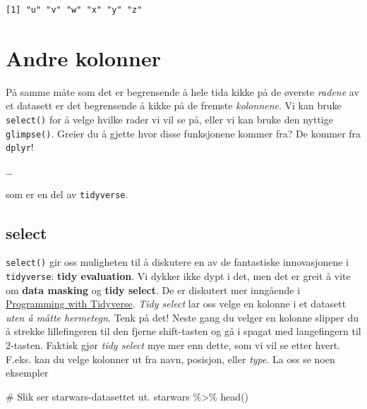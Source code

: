 \documentclass[
  letterpaper,
  DIV=11,
  numbers=noendperiod]{scrreprt}
\newenvironment{Shaded}{\begin{snugshade}}{\end{snugshade}}
\newcommand{\CommentTok}[1]{\textcolor[rgb]{0.37,0.37,0.37}{#1}}
\newcommand{\FunctionTok}[1]{\textcolor[rgb]{0.28,0.35,0.67}{#1}}
\newcommand{\NormalTok}[1]{\textcolor[rgb]{0.00,0.23,0.31}{#1}}
\newcommand{\SpecialCharTok}[1]{\textcolor[rgb]{0.37,0.37,0.37}{#1}}
\begin{document}
\begin{verbatim}
[1] "u" "v" "w" "x" "y" "z"
\end{verbatim}

\hypertarget{andre-kolonner}{%
\section{Andre kolonner}\label{andre-kolonner}}

På samme måte som det er begrensende å hele tida kikke på de øverste
\emph{radene} av et datasett er det begrensende å kikke på de fremste
\emph{kolonnene}. Vi kan bruke \texttt{select()} for å velge hvilke
rader vi vil se på, eller vi kan bruke den nyttige \texttt{glimpse()}.
Greier du å gjette hvor disse funksjonene kommer fra? De kommer fra
\texttt{dplyr}!

\ldots{}

som er en del av \texttt{tidyverse}.

\hypertarget{sec-select}{%
\subsection{select}\label{sec-select}}

\texttt{select()} gir oss muligheten til å diskutere en av de
fantastiske innovasjonene i \texttt{tidyverse}: \textbf{tidy
evaluation}. Vi dykker ikke dypt i det, men det er greit å vite om
\textbf{data masking} og \textbf{tidy select}. De er diskutert mer
inngående i
\href{https://dplyr.tidyverse.org/articles/programming.html}{Programming
with Tidyverse}. \emph{Tidy select} lar oss velge en kolonne i et
datasett \emph{uten å måtte hermetegn}. Tenk på det! Neste gang du
velger en kolonne slipper du å strekke lillefingeren til den fjerne
shift-tasten og gå i spagat med langefingern til 2-tasten. Faktisk gjør
\emph{tidy select} mye mer enn dette, som vi vil se etter hvert. F.eks.
kan du velge kolonner ut fra navn, posisjon, eller \emph{type}. La oss
se noen eksempler

\begin{Shaded}
\begin{Highlighting}[]
\CommentTok{\# Slik ser starwars{-}datasettet ut. }
\NormalTok{starwars }\SpecialCharTok{\%\textgreater{}\%} \FunctionTok{head}\NormalTok{()}
\end{Highlighting}
\end{Shaded}
\end{document}
